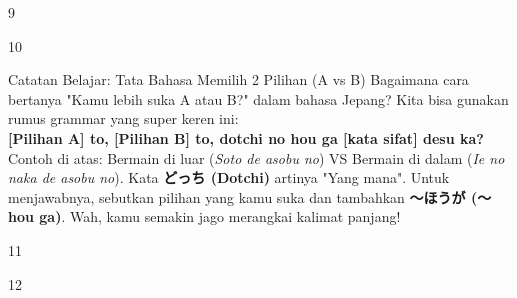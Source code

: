 \begin{convobox}{9}
    \noindent
      

    \vspace{1.5em}
\end{convobox}

\begin{convobox}{10}
    \noindent
      
      

    \vspace{1.5em}
\end{convobox}

\begin{lessonbox}{Catatan Belajar: Tata Bahasa Memilih 2 Pilihan (A vs B)}
    Bagaimana cara bertanya "Kamu lebih suka A atau B?" dalam bahasa Jepang? Kita bisa gunakan rumus grammar yang super keren ini:\\
    
    \textbf{[Pilihan A] to, [Pilihan B] to, dotchi no hou ga [kata sifat] desu ka?}\\
    
    Contoh di atas: Bermain di luar (\textit{Soto de asobu no}) VS Bermain di dalam (\textit{Ie no naka de asobu no}). Kata \textbf{どっち (Dotchi)} artinya "Yang mana". Untuk menjawabnya, sebutkan pilihan yang kamu suka dan tambahkan \textbf{〜ほうが (〜hou ga)}. Wah, kamu semakin jago merangkai kalimat panjang!
\end{lessonbox}

\begin{convobox}{11}
    \noindent
      

    \vspace{1.5em}
\end{convobox}

\begin{convobox}{12}
    \noindent
      

    \vspace{1.5em}
\end{convobox}

